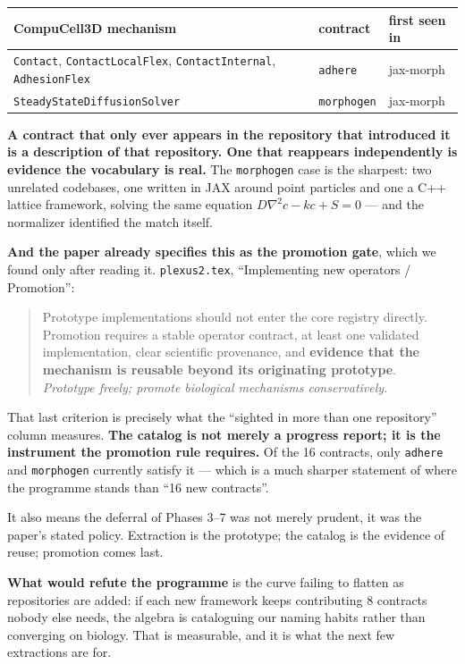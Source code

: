 \documentclass[11pt,a4paper]{article}
\newcommand{\code}[1]{\texttt{#1}}
\begin{document}
\begin{center}
\small
\begin{tabular}{@{}l l l@{}}
\toprule
\textbf{CompuCell3D mechanism} & \textbf{contract} & \textbf{first seen in}\\
\midrule
\code{Contact}, \code{ContactLocalFlex}, \code{ContactInternal}, \code{AdhesionFlex}
 & \code{adhere} & jax-morph\\
\code{SteadyStateDiffusionSolver} & \code{morphogen} & jax-morph\\
\bottomrule
\end{tabular}
\end{center}

\textbf{A contract that only ever appears in the repository that introduced it is a description of
that repository. One that reappears independently is evidence the vocabulary is real.} The
\code{morphogen} case is the sharpest: two unrelated codebases, one written in JAX around point
particles and one a C++ lattice framework, solving the same equation
$D\nabla^2 c - kc + S = 0$ --- and the normalizer identified the match itself.

\textbf{And the paper already specifies this as the promotion gate}, which we found only after
reading it. \code{plexus2.tex}, ``Implementing new operators / Promotion'':

\begin{quote}\small
Prototype implementations should not enter the core registry directly. Promotion requires a
stable operator contract, at least one validated implementation, clear scientific provenance, and
\textbf{evidence that the mechanism is reusable beyond its originating prototype}. \\[3pt]
\emph{Prototype freely; promote biological mechanisms conservatively.}
\end{quote}

That last criterion is precisely what the ``sighted in more than one repository'' column measures.
\textbf{The catalog is not merely a progress report; it is the instrument the promotion rule
requires.} Of the 16 contracts, only \code{adhere} and \code{morphogen} currently satisfy it ---
which is a much sharper statement of where the programme stands than ``16 new contracts''.

It also means the deferral of Phases 3--7 was not merely prudent, it was the paper's stated
policy. Extraction is the prototype; the catalog is the evidence of reuse; promotion comes last.

\textbf{What would refute the programme} is the curve failing to flatten as repositories are
added: if each new framework keeps contributing 8 contracts nobody else needs, the algebra is
cataloguing our naming habits rather than converging on biology. That is measurable, and it is
what the next few extractions are for.
\end{document}
